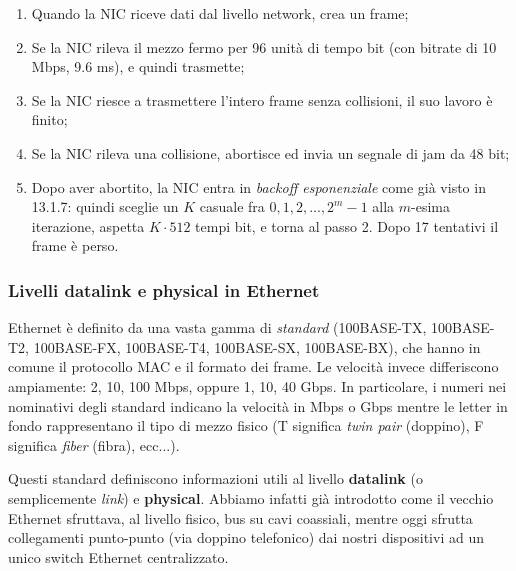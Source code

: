 \documentclass[a4paper,11pt]{article}
\begin{document}
\begin{enumerate}
	\item Quando la NIC riceve dati dal livello network, crea un frame;
	\item Se la NIC rileva il mezzo fermo per 96 unità di tempo bit (con bitrate di 10 Mbps, 9.6 ms), e quindi trasmette;
	\item Se la NIC riesce a trasmettere l'intero frame senza collisioni, il suo lavoro è finito;
	\item Se la NIC rileva una collisione, abortisce ed invia un segnale di jam da 48 bit;
\item Dopo aver abortito, la NIC entra in \textit{backoff esponenziale} come già visto in 13.1.7: quindi sceglie un $K$ casuale fra ${0, 1, 2, ..., 2^m - 1}$ alla $m$-esima iterazione, aspetta $K \cdot 512$ tempi bit, e torna al passo 2. Dopo 17 tentativi il frame è perso.
\end{enumerate}

\subsubsection{Livelli datalink e physical in Ethernet}
Ethernet è definito da una vasta gamma di \textit{standard} (100BASE-TX, 100BASE-T2, 100BASE-FX, 100BASE-T4, 100BASE-SX, 100BASE-BX), che hanno in comune il protocollo MAC e il formato dei frame. Le velocità invece differiscono ampiamente: 2, 10, 100 Mbps, oppure 1, 10, 40 Gbps.
In particolare, i numeri nei nominativi degli standard indicano la velocità in Mbps o Gbps mentre le letter in fondo rappresentano il tipo di mezzo fisico (T significa \textit{twin pair} (doppino), F significa \textit{fiber} (fibra), ecc...).

Questi standard definiscono informazioni utili al livello \textbf{datalink} (o semplicemente \textit{link}) e \textbf{physical}.
Abbiamo infatti già introdotto come il vecchio Ethernet sfruttava, al livello fisico, bus su cavi coassiali, mentre oggi sfrutta collegamenti punto-punto (via doppino telefonico) dai nostri dispositivi ad un unico switch Ethernet centralizzato.
\end{document}
